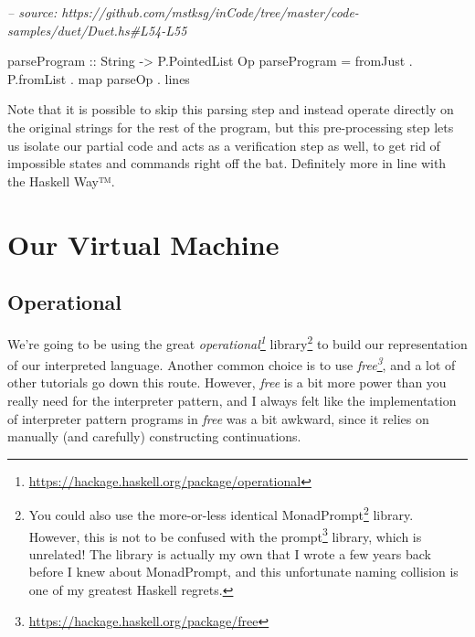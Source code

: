 \documentclass[]{article}
\newenvironment{Shaded}{}{}
\newcommand{\CommentTok}[1]{\textcolor[rgb]{0.38,0.63,0.69}{\textit{#1}}}
\newcommand{\DataTypeTok}[1]{\textcolor[rgb]{0.56,0.13,0.00}{#1}}
\newcommand{\FunctionTok}[1]{\textcolor[rgb]{0.02,0.16,0.49}{#1}}
\newcommand{\NormalTok}[1]{#1}
\newcommand{\OtherTok}[1]{\textcolor[rgb]{0.00,0.44,0.13}{#1}}
\renewcommand{\href}[2]{#2\footnote{\url{#1}}}
\begin{document}
\begin{Shaded}
\begin{Highlighting}[]
\CommentTok{-- source: https://github.com/mstksg/inCode/tree/master/code-samples/duet/Duet.hs#L54-L55}

\OtherTok{parseProgram ::} \DataTypeTok{String} \OtherTok{->} \DataTypeTok{P.PointedList} \DataTypeTok{Op}
\NormalTok{parseProgram }\FunctionTok{=}\NormalTok{ fromJust }\FunctionTok{.}\NormalTok{ P.fromList }\FunctionTok{.}\NormalTok{ map parseOp }\FunctionTok{.}\NormalTok{ lines}
\end{Highlighting}
\end{Shaded}

Note that it is possible to skip this parsing step and instead operate directly
on the original strings for the rest of the program, but this pre-processing
step lets us isolate our partial code and acts as a verification step as well,
to get rid of impossible states and commands right off the bat. Definitely more
in line with the Haskell Way™.

\hypertarget{our-virtual-machine}{%
\section{Our Virtual Machine}\label{our-virtual-machine}}

\hypertarget{operational}{%
\subsection{Operational}\label{operational}}

We're going to be using the great
\emph{\href{https://hackage.haskell.org/package/operational}{operational}}
library\footnote{You could also use the more-or-less identical
  \href{https://hackage.haskell.org/package/operational}{MonadPrompt} library.
  However, this is not to be confused with the
  \href{https://hackage.haskell.org/package/prompt}{prompt} library, which is
  unrelated! The library is actually my own that I wrote a few years back before
  I knew about MonadPrompt, and this unfortunate naming collision is one of my
  greatest Haskell regrets.} to build our representation of our interpreted
language. Another common choice is to use
\emph{\href{https://hackage.haskell.org/package/free}{free}}, and a lot of other
tutorials go down this route. However, \emph{free} is a bit more power than you
really need for the interpreter pattern, and I always felt like the
implementation of interpreter pattern programs in \emph{free} was a bit awkward,
since it relies on manually (and carefully) constructing continuations.
\end{document}
